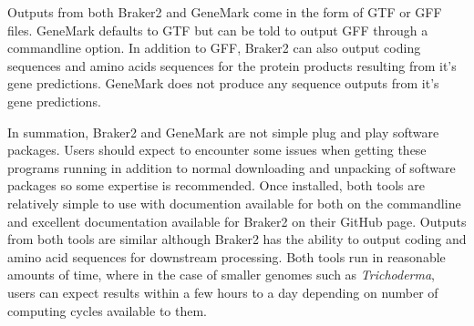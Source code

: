 Outputs from both Braker2 and GeneMark come in the form of GTF or GFF
files. GeneMark defaults to GTF but can be told to output GFF through
a commandline option. In addition to GFF, Braker2 can also output
coding sequences and amino acids sequences for the protein products
resulting from it's gene predictions. GeneMark does not produce any
sequence outputs from it's gene predictions.

In summation, Braker2 and GeneMark are not simple plug and play
software packages. Users should expect to encounter some issues when
getting these programs running in addition to normal downloading and
unpacking of software packages so some expertise is recommended. Once
installed, both tools are relatively simple to use with documention
available for both on the commandline and excellent documentation
available for Braker2 on their GitHub page. Outputs from both tools
are similar although Braker2 has the ability to output coding and
amino acid sequences for downstream processing. Both tools run in
reasonable amounts of time, where in the case of smaller genomes such
as \textit{Trichoderma}, users can expect results within a few hours
to a day depending on number of computing cycles available to them.
